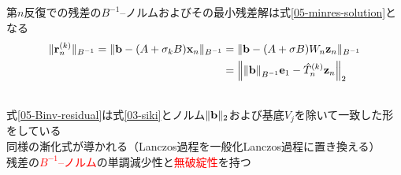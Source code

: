 

第$n$反復での残差の$B^{-1}$--ノルムおよびその最小残差解は式\eqref{05-minres-solution}となる
\begin{align}
	\|\vb{r}_{n}^{(k)}\|_{B^{-1}} = \|\vb{b} - (A + \sigma_{k}B)\vb{x}_{n}\|_{B^{-1}}
		&= \|\vb{b} - (A + \sigma B)W_{n}\vb{z}_{n} \|_{B^{-1}} \notag \\
		&= \left\| \norm{\vb{b}}_{B^{-1}}\vb{e}_1 - \hat{T}_{n}^{(k)} \vb{z}_{n} \right\|_2
		\label{05-Binv-residual}\\
	&\hspace*{-17.5cm}\Rightarrow \ \vb{x}_{n}^{(k)} = \|\vb{b}\|_{B^{-1}} W_{n} R_{n}^{-1} Q_{n}^{\htop} \vb{e}_1
	\label{05-minres-solution}
\end{align}
式\eqref{05-Binv-residual}は式\eqref{03-siki}とノルム$\|\vb{b}\|_2$および基底$V_{j}$を除いて一致した形をしている\\
\myitem 同様の漸化式が導かれる（Lanczos過程を一般化Lanczos過程に置き換える）\\
\myitem 残差の\textcolor{red}{$B^{-1}$--ノルム}の単調減少性と\textcolor{red}{無破綻性}を持つ
